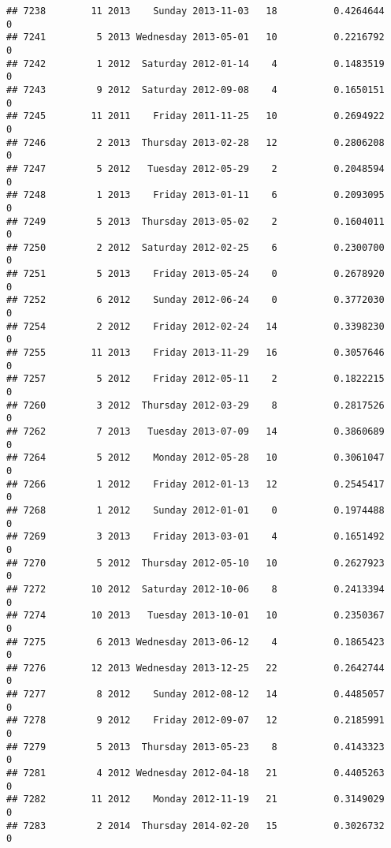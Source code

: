 \documentclass[
]{article}
\begin{document}
\begin{verbatim}
## 7238        11 2013    Sunday 2013-11-03   18          0.4264644             0
## 7241         5 2013 Wednesday 2013-05-01   10          0.2216792             0
## 7242         1 2012  Saturday 2012-01-14    4          0.1483519             0
## 7243         9 2012  Saturday 2012-09-08    4          0.1650151             0
## 7245        11 2011    Friday 2011-11-25   10          0.2694922             0
## 7246         2 2013  Thursday 2013-02-28   12          0.2806208             0
## 7247         5 2012   Tuesday 2012-05-29    2          0.2048594             0
## 7248         1 2013    Friday 2013-01-11    6          0.2093095             0
## 7249         5 2013  Thursday 2013-05-02    2          0.1604011             0
## 7250         2 2012  Saturday 2012-02-25    6          0.2300700             0
## 7251         5 2013    Friday 2013-05-24    0          0.2678920             0
## 7252         6 2012    Sunday 2012-06-24    0          0.3772030             0
## 7254         2 2012    Friday 2012-02-24   14          0.3398230             0
## 7255        11 2013    Friday 2013-11-29   16          0.3057646             0
## 7257         5 2012    Friday 2012-05-11    2          0.1822215             0
## 7260         3 2012  Thursday 2012-03-29    8          0.2817526             0
## 7262         7 2013   Tuesday 2013-07-09   14          0.3860689             0
## 7264         5 2012    Monday 2012-05-28   10          0.3061047             0
## 7266         1 2012    Friday 2012-01-13   12          0.2545417             0
## 7268         1 2012    Sunday 2012-01-01    0          0.1974488             0
## 7269         3 2013    Friday 2013-03-01    4          0.1651492             0
## 7270         5 2012  Thursday 2012-05-10   10          0.2627923             0
## 7272        10 2012  Saturday 2012-10-06    8          0.2413394             0
## 7274        10 2013   Tuesday 2013-10-01   10          0.2350367             0
## 7275         6 2013 Wednesday 2013-06-12    4          0.1865423             0
## 7276        12 2013 Wednesday 2013-12-25   22          0.2642744             0
## 7277         8 2012    Sunday 2012-08-12   14          0.4485057             0
## 7278         9 2012    Friday 2012-09-07   12          0.2185991             0
## 7279         5 2013  Thursday 2013-05-23    8          0.4143323             0
## 7281         4 2012 Wednesday 2012-04-18   21          0.4405263             0
## 7282        11 2012    Monday 2012-11-19   21          0.3149029             0
## 7283         2 2014  Thursday 2014-02-20   15          0.3026732             0

\end{verbatim}
\end{document}
